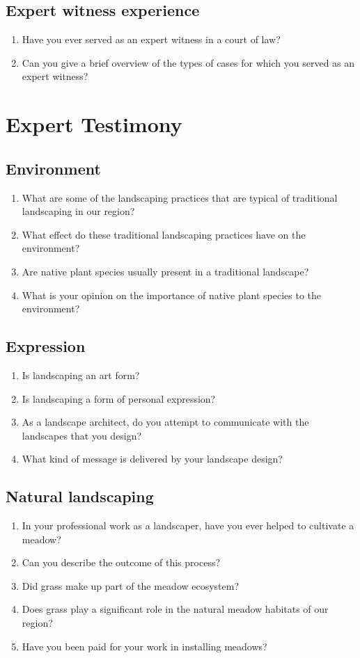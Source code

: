 \documentclass[12pt]{article}
\begin{document}
\subsection{Expert witness experience}
\begin{enumerate}
\item Have you ever served as an expert witness in a court of law?
\item Can you give a brief overview of the types of cases for which you served as an expert witness?
\end{enumerate}



\section{Expert Testimony}

\subsection{Environment}
\begin{enumerate}
\item What are some of the landscaping practices that are typical of traditional landscaping in our region?
\item What effect do these traditional landscaping practices have on the environment?
\item Are native plant species usually present in a traditional landscape?
\item What is your opinion on the importance of native plant species to the environment?
\end{enumerate}

\subsection{Expression}
\begin{enumerate}
\item Is landscaping an art form?
\item Is landscaping a form of personal expression?
\item As a landscape architect, do you attempt to communicate with the landscapes that you design?
\item What kind of message is delivered by your landscape design?
\end{enumerate}

\subsection{Natural landscaping}
\begin{enumerate}
\item In your professional work as a landscaper, have you ever helped to cultivate a meadow?
\item Can you describe the outcome of this process?
\item Did grass make up part of the meadow ecosystem?
\item Does grass play a significant role in the natural meadow habitats of our region?
\item Have you been paid for your work in installing meadows?
\end{enumerate}
\end{document}
